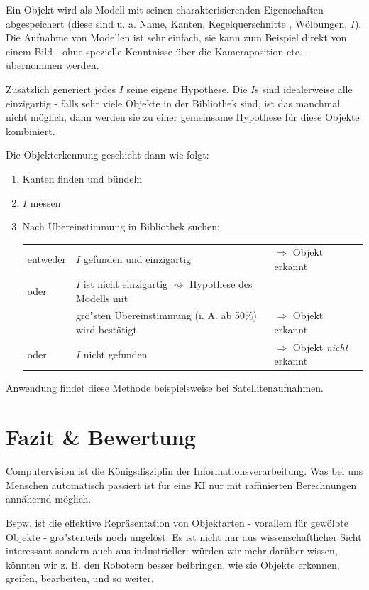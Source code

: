 \begin{itemize}
Ein Objekt wird als Modell mit seinen charakterisierenden Eigenschaften abgespeichert (diese sind u. a. Name, Kanten, Kegelquerschnitte
, Wölbungen, $I$).
Die Aufnahme von Modellen ist sehr einfach, sie kann zum Beispiel direkt von einem Bild - ohne spezielle Kenntnisse über die Kameraposition etc. - übernommen werden.

Zusätzlich generiert jedes $I$ seine eigene Hypothese. Die $I$s sind idealerweise alle einzigartig - falls sehr viele Objekte in der Bibliothek sind, ist das manchmal nicht möglich, dann werden sie zu einer gemeinsame Hypothese für diese Objekte kombiniert.

Die Objekterkennung geschieht dann wie folgt:
\begin{enumerate}
\item Kanten finden und bündeln
\item $I$ messen
\item Nach Übereinstimmung in Bibliothek suchen:
\begin{table}[h]
\centering
\begin{tabular}{lll}
entweder & $I$ gefunden und einzigartig & $\Rightarrow$ Objekt erkannt \\
oder & $I$ ist nicht einzigartig $\rightsquigarrow$ Hypothese des Modells mit &  \\
 & grö"sten Übereinstimmung (i. A. ab 50\%) wird bestätigt & $\Rightarrow$ Objekt erkannt \\
oder & $I$ nicht gefunden & $\Rightarrow$ Objekt \textit{nicht} erkannt
\end{tabular}
\end{table}
\end{enumerate}
Anwendung findet diese Methode beispielsweise bei Satellitenaufnahmen.
\end{itemize}

\section{Fazit \& Bewertung}

Computervision ist die Königsdisziplin der Informationsverarbeitung. Was bei uns Menschen automatisch passiert ist für eine KI nur mit raffinierten Berechnungen annähernd möglich.

Bspw. ist die effektive Repräsentation von Objektarten - vorallem für gewölbte Objekte - grö"stenteils noch ungelöst. Es ist nicht nur aus wissenschaftlicher Sicht interessant sondern auch aus industrieller: würden wir mehr darüber wissen, könnten wir z. B. den Robotern besser beibringen, wie sie Objekte erkennen, greifen, bearbeiten, und so weiter.

